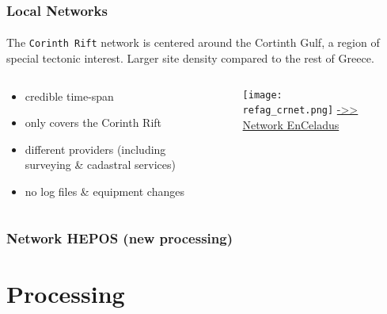 \begin{frame}\frametitle{Local Networks}\framesubtitle{}
\vskip-1cm
  The \texttt{Corinth Rift} network is centered around the Cortinth Gulf, a 
  region of special tectonic interest. Larger site density compared to the 
  rest of Greece.
  \begin{columns}[T]
    \begin{column}{.4\textwidth}
      \begin{itemize}
        \item<pro@1-> credible time-span
        \item<pro@1-> only covers the Corinth Rift
        \item<con@1-> different providers (including surveying \& cadastral services)
        \item<con@1-> no log files \& equipment changes
      \end{itemize}
    \end{column}
    \begin{column}{.6\textwidth}
      \begin{figure}
      \begin{center}
        \texttt{[image: refag\_crnet.png]}
      \href{http://dionysos.survey.ntua.gr/dso/enceladus/}{->> Network EnCeladus}
     \label{fig:crlab}
     \end{center}
 \end{figure}
      
    \end{column}
  \end{columns}
\end{frame}

 \begin{frame}
   \frametitle{Network HEPOS (new processing)}
   \framesubtitle{}
   \label{}
 
 \end{frame}
 \note{} 

\section{Processing}

